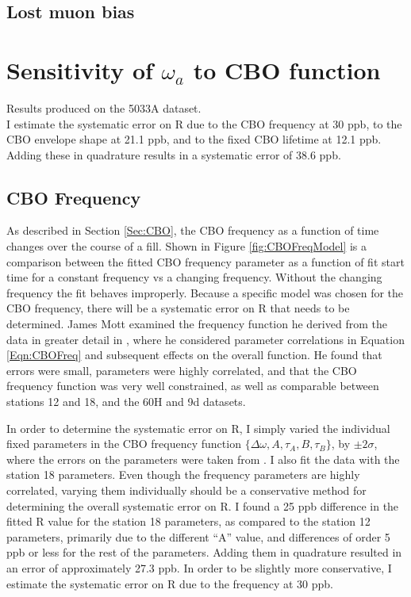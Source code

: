 	\subsection{Lost muon bias}


\section{Sensitivity of \texorpdfstring{$\omega_{a}$}{} to CBO function}
\label{Sec:SystematicCBO}

	Results produced on the 5033A dataset. \\

	I estimate the systematic error on R due to the CBO frequency at 30 ppb, to the CBO envelope shape at 21.1 ppb, and to the fixed CBO lifetime at 12.1 ppb. Adding these in quadrature results in a systematic error of 38.6 ppb.

	\subsection{CBO Frequency}
	\label{Sec:CBOFreq}

	As described in Section \ref{Sec:CBO}, the CBO frequency as a function of time changes over the course of a fill. Shown in Figure \ref{fig:CBOFreqModel} is a comparison between the fitted CBO frequency parameter as a function of fit start time for a constant frequency vs a changing frequency. Without the changing frequency the fit behaves improperly. Because a specific model was chosen for the CBO frequency, there will be a systematic error on R that needs to be determined. James Mott examined the frequency function he derived from the data in greater detail in , where he considered parameter correlations in Equation \ref{Eqn:CBOFreq} and subsequent effects on the overall function. He found that errors were small, parameters were highly correlated, and that the CBO frequency function was very well constrained, as well as comparable between stations 12 and 18, and the 60H and 9d datasets. 

	In order to determine the systematic error on R, I simply varied the individual fixed parameters in the CBO frequency function $\{\Delta\omega, A, \tau_{A}, B, \tau_{B}\}$, by $\pm 2 \sigma$, where the errors on the parameters were taken from . I also fit the data with the station 18 parameters. Even though the frequency parameters are highly correlated, varying them individually should be a conservative method for determining the overall systematic error on R. I found a 25 ppb difference in the fitted R value for the station 18 parameters, as compared to the station 12 parameters, primarily due to the different ``A'' value, and differences of order 5 ppb or less for the rest of the parameters. Adding them in quadrature resulted in an error of approximately 27.3 ppb. In order to be slightly more conservative, I estimate the systematic error on R due to the frequency at 30 ppb.


